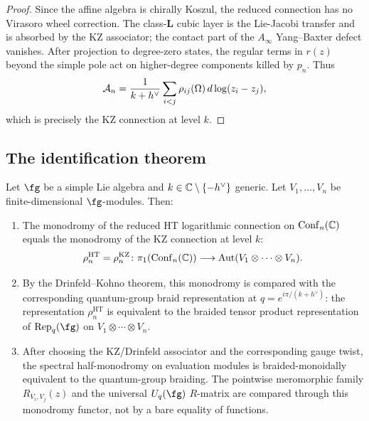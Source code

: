 \begin{proof}
Since the affine algebra is chirally Koszul, the reduced connection
has no Virasoro wheel correction. The class-$\mathbf L$ cubic layer is
the Lie-Jacobi transfer and is absorbed by the KZ associator; the
contact part of the \(A_\infty\) Yang--Baxter defect vanishes. After
projection to degree-zero states, the regular terms in \(r(z)\)
beyond the simple pole act on higher-degree components killed by
\(p_n\). Thus
\[
 \mathcal A_n = \frac{1}{k + h^\vee}\sum_{i < j} \rho_{ij}(\Omega)\, d\log(z_i - z_j),
\]
which is precisely the KZ connection at level $k$.
\end{proof}

\subsection{The identification theorem}

\begin{theorem}
\label{thm:affine-monodromy-identification}
Let $\fg$ be a simple Lie algebra and $k \in \mathbb C \setminus \{-h^\vee\}$ generic. Let $V_1, \dots, V_n$ be finite-dimensional $\fg$-modules. Then:
\begin{enumerate}[label=\textup{(\roman*)}]
 \item The monodromy of the reduced HT logarithmic connection on $\mathrm{Conf}_n(\mathbb C)$ equals the monodromy of the KZ connection at level $k$:
 \[
 \rho_n^{\mathrm{HT}} = \rho_n^{\mathrm{KZ}} \colon \pi_1(\mathrm{Conf}_n(\mathbb C)) \longrightarrow \mathrm{Aut}(V_1 \otimes \cdots \otimes V_n).
 \]
 \item By the Drinfeld--Kohno theorem, this monodromy is compared with the corresponding quantum-group braid representation at $q = e^{i\pi/(k + h^\vee)}$: the representation $\rho_n^{\mathrm{HT}}$ is equivalent to the braided tensor product representation of\/ $\mathrm{Rep}_q(\fg)$ on $V_1 \otimes \cdots \otimes V_n$.
 \item After choosing the KZ/Drinfeld associator and the corresponding
 gauge twist, the spectral half-monodromy on evaluation modules is
 braided-monoidally equivalent to the quantum-group braiding. The
 pointwise meromorphic family $R_{V_i,V_j}(z)$ and the universal
 $U_q(\fg)$ $R$-matrix are compared through this monodromy functor, not
 by a bare equality of functions.
\end{enumerate}
\end{theorem}


